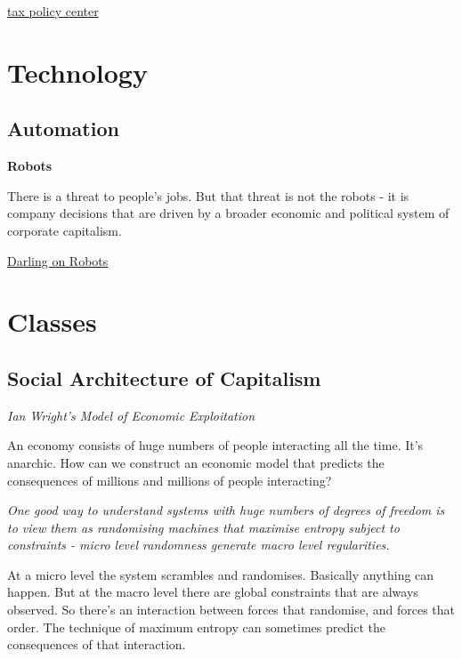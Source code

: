 \documentclass[
]{book}
\begin{document}
\href{https://www.taxpolicycenter.org/taxvox/who-owns-us-stock-foreigners-and-rich-americans}{tax policy center}

\hypertarget{technology}{%
\chapter{Technology}\label{technology}}

\hypertarget{automation}{%
\section{Automation}\label{automation}}

\textbf{Robots}

There is a threat to people's jobs. But that threat is not the robots - it is company decisions that are driven by a broader economic and political system of corporate capitalism.

\href{https://www.theguardian.com/technology/2021/apr/17/ai-ethicist-kate-darling-robots-can-be-our-partners}{Darling on Robots}

\hypertarget{classes}{%
\chapter{Classes}\label{classes}}

\hypertarget{social-architecture-of-capitalism}{%
\section{Social Architecture of Capitalism}\label{social-architecture-of-capitalism}}

\emph{Ian Wright's Model of Economic Exploitation}

An economy consists of huge numbers of people interacting all the time.
It's anarchic.
How can we construct an economic model that predicts
the consequences of millions and millions of people interacting?

\emph{One good way to understand systems with huge numbers of degrees of freedom is to view them as randomising machines that maximise entropy subject to constraints -
micro level randomness generate macro level regularities.}

At a micro level the system scrambles and randomises.
Basically anything can happen.
But at the macro level there are global constraints that are always observed.
So there's an interaction between forces that randomise, and forces that order.
The technique of maximum entropy can sometimes predict the consequences of that interaction.
\end{document}
